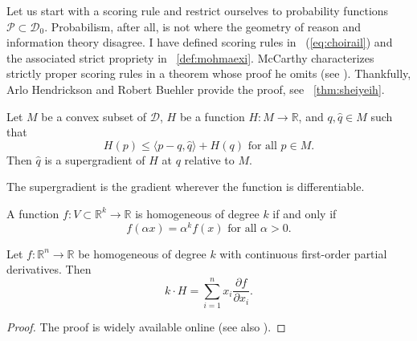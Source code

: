 \documentclass[12pt]{article}
\begin{document}
Let us start with a scoring rule and restrict ourselves to probability
functions $\mathcal{P}\subset\mathcal{D}_{0}$. Probabilism, after all,
is not where the geometry of reason and information theory disagree.
I have defined scoring rules in {\quation}~(\ref{eq:choirail}) and the
associated strict propriety in {\efinition}~\ref{def:mohmaexi}.
McCarthy characterizes strictly proper scoring rules in a theorem
whose proof he omits (see ). Thankfully,
Arlo Hendrickson and Robert Buehler provide the proof, see
{\heorem}~\ref{thm:sheiyeih}.

\begin{definition}
  \label{def:yahjoith}
  Let $M$ be a convex subset of $\mathcal{D}$, $H$ be a function
  $H:M\rightarrow\mathbb{R}$, and $q,\hat{q}\in{}M$ such that
  \begin{equation}
    \label{eq:fooceiya}
    H(p)\leq\langle{}p-q,\hat{q}\rangle+H(q)\mbox{ for all }p\in{}M.
  \end{equation}
Then $\hat{q}$ is a supergradient of $H$ at $q$ relative to $M$. 
\end{definition}

The supergradient is the gradient wherever the function is
differentiable.

\begin{definition}
  \label{def:ahthaive}
  A function $f:V\subset\mathbb{R}^{k}\rightarrow\mathbb{R}$ is
  homogeneous of degree $k$ if and only if
  \begin{equation}
    \label{eq:ooveighe}
    f(\alpha{}x)=\alpha^{k}f(x)\mbox{ for all }\alpha>0.
  \end{equation}
\end{definition}

\begin{theorem}
  \label{thm:sheiyeih}
  Let $f:\mathbb{R}^{n}\rightarrow\mathbb{R}$ be homogeneous of degree
  $k$ with continuous first-order partial derivatives. Then
  \begin{equation}
    \label{eq:uiwohher}
    k\cdot{}H=\sum_{i=1}^{n}x_{i}\frac{\partial{}f}{\partial{}x_{i}}.
  \end{equation}
\end{theorem}
\begin{proof}
  \label{prf:aethielu}
  The proof is widely available online (see also
  ). 
\end{proof}
\end{document}
